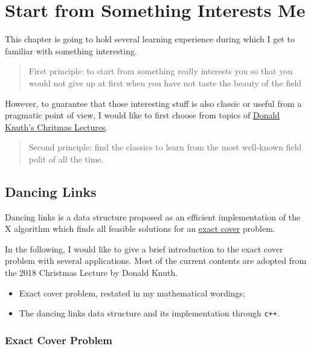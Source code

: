 \documentclass[]{book}
\providecommand{\tightlist}{%
  \setlength{\itemsep}{0pt}\setlength{\parskip}{0pt}}
\begin{document}
\hypertarget{intro}{%
\chapter{Start from Something Interests Me}\label{intro}}

This chapter is going to hold several learning experience during
which I get to familiar with something interesting.

\begin{quote}
First principle: to start from something really interests you
so that you would not give up at first when you have not taste
the beauty of the field
\end{quote}

However, to guarantee that those interesting stuff is also classic
or useful from a pragmatic point of view, I would like to first
choose from topics of \href{https://www-cs-faculty.stanford.edu/~knuth/musings.html}{Donald Knuth's Chritmas Lectures}.

\begin{quote}
Second principle: find the classics to learn from the most well-known
field polit of all the time.
\end{quote}

\hypertarget{dancing-links}{%
\section{Dancing Links}\label{dancing-links}}

Dancing links is a data structure proposed as an efficient implementation
of the X algorithm which finds all feasible solutions for an \href{https://en.wikipedia.org/wiki/Exact_cover}{exact cover}
problem.

In the following, I would like to give a brief introduction to the exact cover
problem with several applications. Most of the current contents are adopted
from the 2018 Christmas Lecture by Donald Knuth.

\begin{itemize}
\tightlist
\item
  Exact cover problem, restated in my mathematical wordings;
\item
  The dancing links data structure and its implementation through \texttt{c++}.
\end{itemize}

\hypertarget{exact-cover-problem}{%
\subsection{Exact Cover Problem}\label{exact-cover-problem}}
\end{document}
